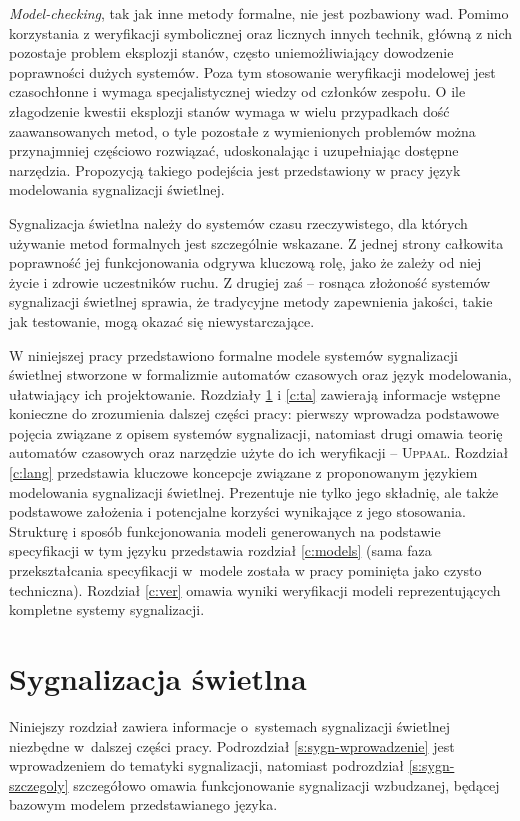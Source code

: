 \documentclass{pracamgr}
\newcommand{\upp}{\textsc{Uppaal}}
\theoremstyle{plain}
\begin{document}
\emph{Model-checking}, tak jak inne metody formalne, nie jest
pozbawiony wad. Pomimo korzystania z weryfikacji symbolicznej oraz
licznych innych technik, główną z nich pozostaje problem eksplozji
stanów, często uniemożliwiający dowodzenie poprawności dużych
systemów. Poza tym stosowanie weryfikacji modelowej jest czasochłonne
i wymaga specjalistycznej wiedzy od członków zespołu. O ile
złagodzenie kwestii eksplozji stanów wymaga w wielu przypadkach dość
zaawansowanych metod, o tyle pozostałe z wymienionych problemów można
przynajmniej częściowo rozwiązać, udoskonalając i uzupełniając
dostępne narzędzia. Propozycją takiego podejścia jest przedstawiony w
pracy język modelowania sygnalizacji świetlnej.

Sygnalizacja świetlna należy do systemów czasu rzeczywistego, dla
których używanie metod formalnych jest szczególnie wskazane. Z jednej
strony całkowita poprawność jej funkcjonowania odgrywa kluczową
rolę, jako że zależy od niej życie i zdrowie uczestników ruchu. Z
drugiej zaś -- rosnąca złożoność systemów sygnalizacji świetlnej
sprawia, że tradycyjne metody zapewnienia jakości, takie jak
testowanie, mogą okazać się niewystarczające.

W niniejszej pracy przedstawiono formalne modele systemów sygnalizacji
świetlnej stworzone w formalizmie automatów czasowych oraz język
modelowania, ułatwiający ich projektowanie.  Rozdziały \ref{c:signals}
i \ref{c:ta} zawierają informacje wstępne konieczne do zrozumienia
dalszej części pracy: pierwszy wprowadza podstawowe pojęcia związane z
opisem systemów sygnalizacji, natomiast drugi omawia teorię automatów
czasowych oraz narzędzie użyte do ich weryfikacji -- \upp.  Rozdział
\ref{c:lang} przedstawia kluczowe koncepcje związane z proponowanym
językiem modelowania sygnalizacji świetlnej. Prezentuje nie tylko jego
składnię, ale także podstawowe założenia i potencjalne korzyści
wynikające z jego stosowania. Strukturę i sposób funkcjonowania modeli
generowanych na podstawie specyfikacji w tym języku przedstawia
rozdział \ref{c:models} (sama faza przekształcania specyfikacji
w~modele została w pracy pominięta jako czysto techniczna). Rozdział
\ref{c:ver} omawia wyniki weryfikacji modeli reprezentujących
kompletne systemy sygnalizacji.

\chapter{Sygnalizacja świetlna}
\label{c:signals}

Niniejszy rozdział zawiera informacje o~systemach sygnalizacji
świetlnej niezbędne w~dalszej części pracy. Podrozdział
\ref{s:sygn-wprowadzenie} jest wprowadzeniem do tematyki sygnalizacji,
natomiast podrozdział \ref{s:sygn-szczegoly} szczegółowo omawia
funkcjonowanie sygnalizacji wzbudzanej, będącej bazowym modelem
przedstawianego języka.
\end{document}
